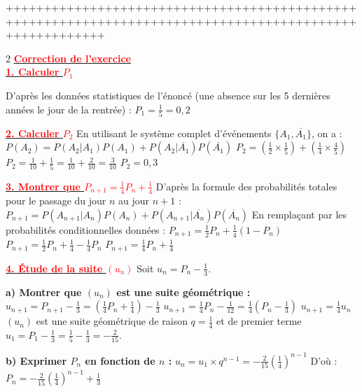 \documentclass[12pt,a4paper]{article}
\begin{document}
+++++++++++++++++++++++++++++++++++++++++++++++++++++++++++++++++++++++++++++++++++++++++++++++++++++++++
\begin{multicols}{2}
\setlength{\columnseprule}{0.1mm} %
\underline{\textbf{\textcolor{red}{Correction de l'exercice}}}\\

\underline{\textbf{\textcolor{red}{1. Calculer $P_1$}}}

D'après les données statistiques de l'énoncé (une absence sur les 5 dernières années le jour de la rentrée) :
$ P_1 = \frac{1}{5} = 0,2 $

\underline{\textbf{\textcolor{red}{2. Calculer $P_2$}}}
En utilisant le système complet d'événements $\{A_1, \overline{A_1}\}$, on a :
$ P(A_2) = P(A_2 | A_1) P(A_1) + P(A_2 | \overline{A_1}) P(\overline{A_1}) $
$ P_2 = \left( \frac{1}{2} \times \frac{1}{5} \right) + \left( \frac{1}{4} \times \frac{4}{5} \right) $
$ P_2 = \frac{1}{10} + \frac{1}{5} = \frac{1}{10} + \frac{2}{10} = \frac{3}{10} $
$ P_2 = 0,3 $

\underline{\textbf{\textcolor{red}{3. Montrer que $P_{n+1} = \frac{1}{4} P_n + \frac{1}{4}$}}}
D'après la formule des probabilités totales pour le passage du jour $n$ au jour $n+1$ :
$ P_{n+1} = P(A_{n+1} | A_n) P(A_n) + P(A_{n+1} | \overline{A_n}) P(\overline{A_n}) $
En remplaçant par les probabilités conditionnelles données :
$ P_{n+1} = \frac{1}{2} P_n + \frac{1}{4} (1 - P_n) $
$ P_{n+1} = \frac{1}{2} P_n + \frac{1}{4} - \frac{1}{4} P_n $
$ P_{n+1} = \frac{1}{4} P_n + \frac{1}{4} $

\underline{\textbf{\textcolor{red}{4. Étude de la suite $(u_n)$}}}
Soit $u_n = P_n - \frac{1}{3}$.

\textbf{a) Montrer que $(u_n)$ est une suite géométrique :}
$ u_{n+1} = P_{n+1} - \frac{1}{3} = \left( \frac{1}{4} P_n + \frac{1}{4} \right) - \frac{1}{3} $
$ u_{n+1} = \frac{1}{4} P_n - \frac{1}{12} = \frac{1}{4} \left( P_n - \frac{1}{3} \right) $
$ u_{n+1} = \frac{1}{4} u_n $
$(u_n)$ est une suite géométrique de raison $q = \frac{1}{4}$ et de premier terme $u_1 = P_1 - \frac{1}{3} = \frac{1}{5} - \frac{1}{3} = -\frac{2}{15}$.

\textbf{b) Exprimer $P_n$ en fonction de $n$ :}
$ u_n = u_1 \times q^{n-1} = -\frac{2}{15} \left( \frac{1}{4} \right)^{n-1} $
D'où :
$ P_n = -\frac{2}{15} \left( \frac{1}{4} \right)^{n-1} + \frac{1}{3} $


\end{multicols}
\end{document}
